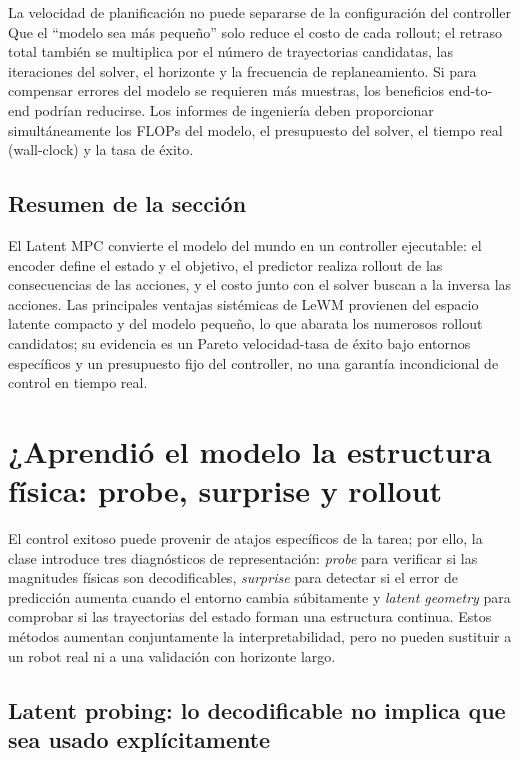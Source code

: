 \documentclass[a4paper]{article}
\begin{document}
\begin{warningbox}{La velocidad de planificación no puede separarse de la configuración del controller}
Que el ``modelo sea más pequeño'' solo reduce el costo de cada rollout; el retraso total también se multiplica por el número de trayectorias candidatas, las iteraciones del solver, el horizonte y la frecuencia de replaneamiento. Si para compensar errores del modelo se requieren más muestras, los beneficios end-to-end podrían reducirse. Los informes de ingeniería deben proporcionar simultáneamente los FLOPs del modelo, el presupuesto del solver, el tiempo real (wall-clock) y la tasa de éxito.
\end{warningbox}

\subsection{Resumen de la sección}

El Latent MPC convierte el modelo del mundo en un controller ejecutable: el encoder define el estado y el objetivo, el predictor realiza rollout de las consecuencias de las acciones, y el costo junto con el solver buscan a la inversa las acciones. Las principales ventajas sistémicas de LeWM provienen del espacio latente compacto y del modelo pequeño, lo que abarata los numerosos rollout candidatos; su evidencia es un Pareto velocidad-tasa de éxito bajo entornos específicos y un presupuesto fijo del controller, no una garantía incondicional de control en tiempo real.


\section{¿Aprendió el modelo la estructura física: probe, surprise y rollout}

El control exitoso puede provenir de atajos específicos de la tarea; por ello, la clase introduce tres diagnósticos de representación: \textit{probe} para verificar si las magnitudes físicas son decodificables, \textit{surprise} para detectar si el error de predicción aumenta cuando el entorno cambia súbitamente y \textit{latent geometry} para comprobar si las trayectorias del estado forman una estructura continua. Estos métodos aumentan conjuntamente la interpretabilidad, pero no pueden sustituir a un robot real ni a una validación con horizonte largo.

\subsection{Latent probing: lo decodificable no implica que sea usado explícitamente}
\end{document}
